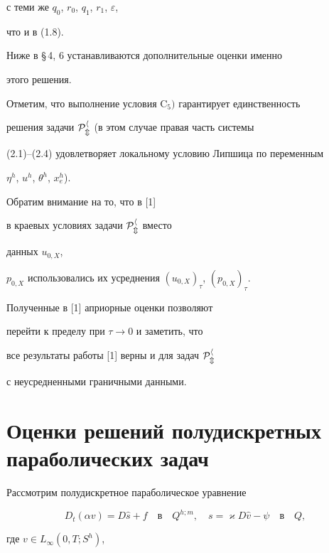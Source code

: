 с теми же $q_0$, $r_0$, $q_1$, $r_1$, $\varepsilon$,


что и в (1.8).


Ниже в \S\,4, 6 устанавливаются дополнительные оценки именно


этого решения.


Отметим, что выполнение условия C${}_5)$ гарантирует единственность


решения задачи $\cal P_m^h$ (в этом случае правая часть системы


(2.1)--(2.4) удовлетворяет локальному условию Липшица по переменным


$\eta^h$, $u^h$, $\theta^h$, $x^h_e$).





\begin{notes} Обратим внимание на то, что в [1]


в краевых условиях задачи $\cal P_m^h$ вместо


данных $u_{0,X}$,


$p_{0,X}$ использовались их усреднения $(u_{0,X})_{\tau}$, $(p_{0,X})_{\tau}$.


Полученные в [1] априорные оценки позволяют


перейти к пределу при $\tau\to 0$ и заметить, что


все результаты работы [1] верны и для задач $\cal P_m^h$


с неусредненными граничными данными.


\end{notes}





\section{Оценки решений полудискретных параболических задач}





Рассмотрим полудискретное параболическое уравнение


\begin{equation}


D_t(\alpha v)=D\widehat s +f\quad\text{в}\quad Q^{h;m},\quad


s=\varkappa D\widehat v - \psi\quad\text{в}\quad Q,


\end{equation}


где $v\in L_\infty(0,T;S^h)$,


